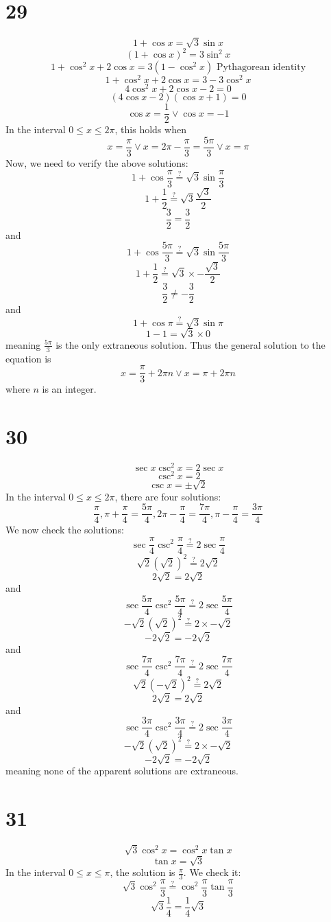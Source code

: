 \documentclass{article}
\theoremstyle{definition}
\newcommand{\?}{\stackrel{?}{=}}
\begin{document}
\section*{29}
\[ 1+\cos x=\sqrt{3}\sin x \]
\[ (1+\cos x)^2=3\sin ^2x \]
\[ 1+\cos^2 x+2\cos x=3(1-\cos^2 x)\textrm{ Pythagorean identity} \]
\[ 1+\cos^2 x+2\cos x=3-3\cos^2 x \]
\[ 4\cos^2 x+2\cos x-2=0 \]
\[ (4\cos x-2)(\cos x+1)=0 \]
\[ \cos x=\frac{1}{2}\vee \cos x=-1 \]
In the interval $0\le x\le 2\pi$, this holds when 
\[ x=\frac{\pi}{3}\vee x=2\pi-\frac{\pi}{3}=\frac{5\pi}{3}\vee x=\pi \]
Now, we need to verify the above solutions:
\[ 1+\cos\frac{\pi}{3}\? \sqrt{3}\sin\frac{\pi}{3} \]
\[ 1+\frac{1}{2}\?\sqrt{3}\frac{\sqrt{3}}{2} \]
\[ \frac{3}{2}=\frac{3}{2} \] and
\[ 1+\cos\frac{5\pi}{3}\?\sqrt{3}\sin\frac{5\pi}{3} \]
\[ 1+\frac{1}{2}\?\sqrt{3}\times -\frac{\sqrt{3}}{2} \]
\[ \frac{3}{2}\ne -\frac{3}{2} \]
and
\[ 1+\cos\pi\?\sqrt{3}\sin\pi \]
\[ 1-1=\sqrt{3}\times 0 \]
meaning $\frac{5\pi}{3}$ is the only extraneous solution.
Thus the general solution to the equation is
\[ x=\frac{\pi}{3}+2\pi n\vee x=\pi +2\pi n \] where $n$ is an integer.

\section*{30}
\[ \sec x\csc^2 x=2\sec x \]
\[ \csc^2 x=2 \]
\[ \csc x=\pm\sqrt{2} \]
In the interval $0\le x\le 2\pi$, there are four solutions:
\[ \frac{\pi}{4},\pi+\frac{\pi}{4}=\frac{5\pi}{4},2\pi-\frac{\pi}{4}=\frac{7\pi}{4},\pi-\frac{\pi}{4}=\frac{3\pi}{4} \]
We now check the solutions:
\[ \sec\frac{\pi}{4}\csc^2\frac{\pi}{4}\? 2\sec\frac{\pi}{4} \]
\[ \sqrt{2}(\sqrt{2})^2\? 2\sqrt{2} \]
\[ 2\sqrt{2}=2\sqrt{2} \]
and
\[ \sec\frac{5\pi}{4}\csc^2\frac{5\pi}{4}\? 2\sec\frac{5\pi}{4} \]
\[ -\sqrt{2}(\sqrt{2})^2\? 2\times -\sqrt{2} \]
\[ -2\sqrt{2}=-2\sqrt{2} \]
and
\[ \sec\frac{7\pi}{4}\csc^2\frac{7\pi}{4}\? 2\sec\frac{7\pi}{4} \]
\[ \sqrt{2}(-\sqrt{2})^2\? 2\sqrt{2} \]
\[ 2\sqrt{2}=2\sqrt{2} \]
and
\[ \sec\frac{3\pi}{4}\csc^2\frac{3\pi}{4}\? 2\sec\frac{3\pi}{4} \]
\[ -\sqrt{2}(\sqrt{2})^2\? 2\times -\sqrt{2} \]
\[ -2\sqrt{2}=-2\sqrt{2} \]
meaning none of the apparent solutions are extraneous.

\section*{31}
\[ \sqrt{3}\cos^2 x=\cos^2 x\tan x \]
\[ \tan x=\sqrt{3} \]
In the interval $0\le x\le \pi$, the solution is $\frac{\pi}{3}$. We check it:
\[ \sqrt{3}\cos^2\frac{\pi}{3}\?\cos^2\frac{\pi}{3}\tan\frac{\pi}{3} \]
\[ \sqrt{3}\frac{1}{4}=\frac{1}{4}\sqrt{3} \]
\end{document}
